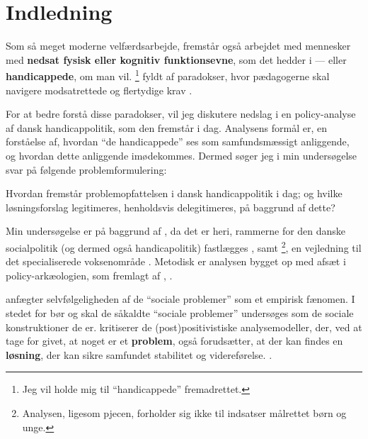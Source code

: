 \section{Indledning}

Som så meget moderne velfærdsarbejde, fremstår også arbejdet med mennesker med \textbf{nedsat fysisk eller kognitiv funktionsevne}, som det hedder i  — eller \textbf{handicappede}, om man vil. \footnote{Jeg vil holde mig til “handicappede” fremadrettet.} fyldt af paradokser, hvor pædagogerne skal navigere modsatrettede og flertydige krav \autocite{mik-meyerIndledningSkabeProfessionel2012}.

For at bedre forstå disse paradokser, vil jeg diskutere nedslag i en policy-analyse af dansk handicappolitik, som den fremstår i dag.
Analysens formål er, en forståelse af, hvordan “de handicappede” ses som samfundsmæssigt anliggende, og hvordan dette anliggende imødekommes.
Dermed søger jeg i min undersøgelse svar på følgende problemformulering:

Hvordan fremstår problemopfattelsen i dansk handicappolitik i dag; og hvilke løsningsforslag legitimeres, henholdsvis delegitimeres, på baggrund af dette?

Min undersøgelse er på baggrund af , da det er heri, rammerne for den danske socialpolitik (og dermed også handicapolitik) fastlægges \autocite[kapitel 2]{social-ogindenrigsministerietBekendtgorelseAfLov2019}, samt \footnote{Analysen, ligesom pjecen, forholder sig ikke til indsatser målrettet børn og unge.}, en vejledning til det specialiserede voksenområde \autocite{klStyringAfDet2017}.
Metodisk er analysen bygget op med afsæt i policy-arkæologien, som fremlagt af \citeauthor{scheurichPolicyArchaeologyNew1994}, \citeyear{scheurichPolicyArchaeologyNew1994}.

\citeauthor{scheurichPolicyArchaeologyNew1994} anfægter selvfølgeligheden af de “sociale problemer” som et empirisk fænomen.
I stedet for bør og skal de såkaldte “sociale problemer” undersøges som de sociale konstruktioner de er.
\citeauthor{scheurichPolicyArchaeologyNew1994} kritiserer de (post)positivistiske analysemodeller, der, ved at tage for givet, at noget er et \textbf{problem}, også forudsætter, at der kan findes en \textbf{løsning}, der kan sikre samfundet stabilitet og videreførelse. \autocite[ss. 298-299]{scheurichPolicyArchaeologyNew1994}.

